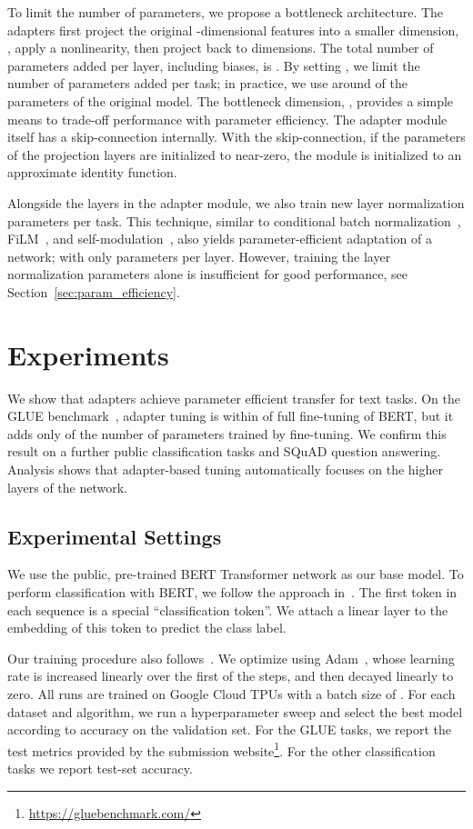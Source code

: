 \documentclass{article}
\begin{document}
To limit the number of parameters, we propose a bottleneck architecture.
The adapters first project the original -dimensional features into a smaller dimension, , apply a nonlinearity, then project back to  dimensions.
The total number of parameters added per layer, including biases, is .
By setting , we limit the number of parameters added per task;
in practice, we use around  of the parameters of the original model.
The bottleneck dimension, , provides a simple means to trade-off performance with parameter efficiency.
The adapter module itself has a skip-connection internally.
With the skip-connection, if the parameters of the projection layers are initialized to near-zero,
the module is initialized to an approximate identity function.

Alongside the layers in the adapter module, we also train new layer normalization parameters per task.
This technique, similar to conditional batch normalization~\citep{de2017modulating},
FiLM~\citep{perez2018}, and self-modulation~\citep{chen2019}, also yields parameter-efficient adaptation of a network; with only  parameters per layer.
However, training the layer normalization parameters alone is insufficient for good performance,
see Section~\ref{sec:param_efficiency}.
 \section{Experiments\label{sec:experiments}}

We show that adapters achieve parameter efficient transfer for text tasks.
On the GLUE benchmark~\citep{wang2018glue},
adapter tuning is within  of full fine-tuning of BERT, but it adds only  of the number of parameters trained by fine-tuning.
We confirm this result on a further  public classification tasks and SQuAD question answering.
Analysis shows that adapter-based tuning automatically focuses on the higher layers of the network.

\subsection{Experimental Settings}

We use the public, pre-trained BERT Transformer network as our base model.
To perform classification with BERT, we follow the approach in~\citet{devlin2018bert}.
The first token in each sequence is a special ``classification token''.
We attach a linear layer to the embedding of this token to predict the class label.

Our training procedure also follows~\citet{devlin2018bert}.
We optimize using Adam~\citep{kingma2014adam},
whose learning rate is increased linearly over the first  of the steps, and then decayed linearly to zero.
All runs are trained on  Google Cloud TPUs with a batch size of .
For each dataset and algorithm, we run a hyperparameter sweep and select the best model according to accuracy on the validation set.
For the GLUE tasks, we report the test metrics provided by the submission website\footnote{\url{https://gluebenchmark.com/}}.
For the other classification tasks we report test-set accuracy.
\end{document}
